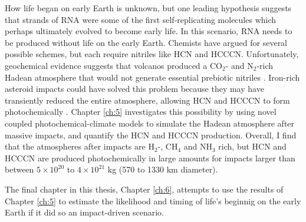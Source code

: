 How life began on early Earth is unknown, but one leading hypothesis suggests that strands of RNA were some of the first self-replicating molecules which perhaps ultimately evolved to become early life. In this scenario, RNA needs to be produced without life on the early Earth. Chemists have argued for several possible schemes, but each require nitriles like HCN and HCCCN. Unfortunately, geochemical evidence suggests that volcanos produced a CO$_2$- and N$_2$-rich Hadean atmosphere that would not generate essential prebiotic nitriles \citep{Holland_1984}. Iron-rich asteroid impacts could have solved this problem because they may have transiently reduced the entire atmosphere, allowing HCN and HCCCN to form photochemically \citep{Zahnle_2020}. Chapter \ref{ch:5} investigates this possibility by using novel coupled photochemical-climate models to simulate the Hadean atmosphere after massive impacts, and quantify the HCN and HCCCN production. Overall, I find that the atmospheres after impacts are H$_2$-, CH$_4$ and NH$_3$ rich, but HCN and HCCCN are produced photochemically in large amounts for impacts larger than between $5 \times 10^{20}$ to $4 \times 10^{21}$ kg (570 to 1330 km diameter). 

The final chapter in this thesis, Chapter \ref{ch:6}, attempts to use the results of Chapter \ref{ch:5} to estimate the likelihood and timing of life's beginnig on the early Earth if it did so an impact-driven scenario.
